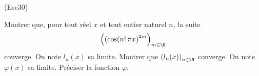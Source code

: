 \begin{tiny}(Esc30)\end{tiny} Montrer que, pour tout réel $x$ et tout entier naturel $n$, la suite
\begin{displaymath}
  \left( \left( \cos(n!\,\pi x\right)^{2m} \right)_{m\in \N}
\end{displaymath}
converge. On note $l_n(x)$ sa limite. Montrer que $\left( l_n(x)\right)_{n\in \N}$ converge. On note $\varphi(x)$ sa limite. Préciser la fonction $\varphi$.